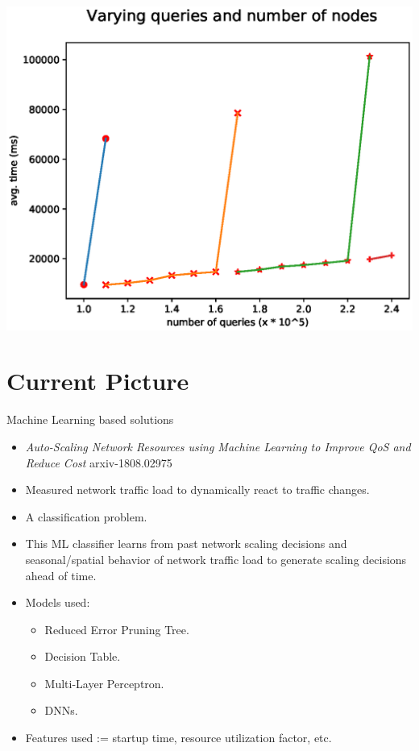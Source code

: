 \documentclass{beamer}
\begin{document}
\begin{frame}
    \includegraphics[width=\textwidth]{fig8.eps}
\end{frame}

\section{Current Picture}

\begin{frame}{Machine Learning based solutions}
\begin{itemize}
    \pause\item \textit{Auto-Scaling Network Resources using Machine Learning to Improve QoS and Reduce Cost} arxiv-1808.02975
    \pause\item Measured network traffic load to dynamically react to traffic changes.
    \pause\item A classification problem.
    \pause\item This ML classifier learns from past network scaling decisions and seasonal/spatial
            behavior of network traffic load to generate scaling decisions ahead of time. 
    \pause\item Models used:
        \begin{itemize}
                \pause\item Reduced Error Pruning Tree.
                \pause\item Decision Table.
                \pause\item Multi-Layer Perceptron.
                \pause\item DNNs.
        \end{itemize}
    \pause\item Features used :=  startup time, resource utilization factor, etc.
\end{itemize}
\end{frame}
\end{document}
